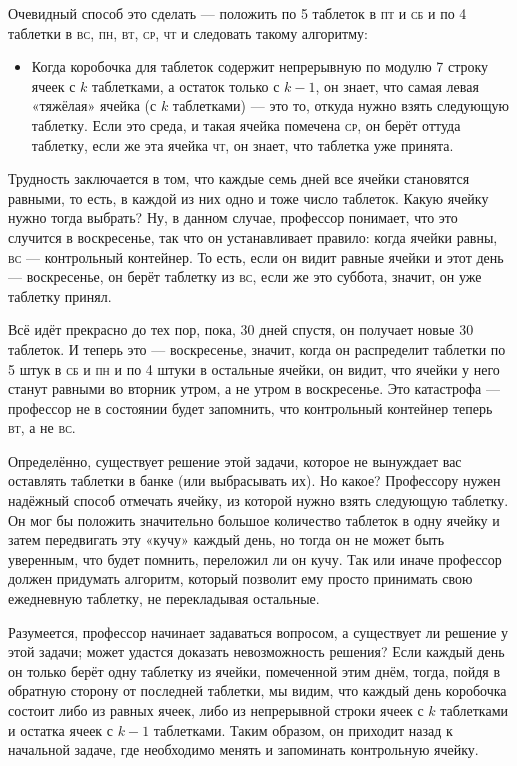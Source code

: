 Очевидный способ это сделать --- положить по 5 таблеток в \textsc{пт} и \textsc{сб} и по 4 таблетки в \textsc{вс}, \textsc{пн}, \textsc{вт}, \textsc{ср}, \textsc{чт} и следовать такому алгоритму:
\begin{itemize}
 \item[] Когда коробочка для таблеток содержит непрерывную по модулю 7 строку ячеек с $k$ таблетками, а остаток только с $k-1$, он знает, что самая левая «тяжёлая» ячейка (с $k$ таблетками) --- это то, откуда нужно взять следующую таблетку.
Если это среда, и такая ячейка помечена \textsc{ср}, он берёт оттуда таблетку, если же эта ячейка \textsc{чт}, он знает, что таблетка уже принята.
\end{itemize}

Трудность заключается в том, что каждые семь дней все ячейки становятся равными, то есть, в каждой из них одно и тоже число таблеток.
Какую ячейку нужно тогда выбрать?
Ну, в данном случае, профессор понимает, что это случится в воскресенье, так что он устанавливает правило: когда ячейки равны, \textsc{вс} --- контрольный контейнер.
То есть, если он видит равные ячейки и этот день --- воскресенье, он берёт таблетку из \textsc{вс}, если же это суббота, значит, он уже таблетку принял.

Всё идёт прекрасно до тех пор, пока, 30 дней спустя, он получает новые 30 таблеток.
И теперь это --- воскресенье, значит, когда он распределит таблетки по 5 штук в \textsc{сб} и \textsc{пн} и по 4 штуки в остальные ячейки, он видит, что ячейки у него станут равными во вторник утром, а не утром в воскресенье.
Это катастрофа --- профессор не в состоянии будет запомнить, что контрольный контейнер теперь \textsc{вт}, а не \textsc{вс}.

Определённо, существует решение этой задачи, которое не вынуждает вас оставлять таблетки в банке (или выбрасывать их).
Но какое? Профессору нужен надёжный способ отмечать ячейку, из которой нужно взять следующую таблетку.
Он мог бы положить значительно большое количество таблеток в одну ячейку и затем передвигать эту «кучу» каждый день, но тогда он не может быть уверенным, что будет помнить, переложил ли он кучу.
Так или иначе профессор должен придумать алгоритм, который позволит ему просто принимать свою ежедневную таблетку, не перекладывая остальные.

Разумеется, профессор начинает задаваться вопросом, а существует ли решение у этой задачи;
может удастся доказать невозможность решения?
Если каждый день он только берёт одну таблетку из ячейки, помеченной этим днём, тогда, пойдя в обратную сторону от последней таблетки, мы видим, что каждый день коробочка состоит либо из равных ячеек, либо из непрерывной строки ячеек с $k$ таблетками и остатка ячеек с $k-1$ таблетками.
Таким образом, он приходит назад к начальной задаче, где необходимо менять и запоминать контрольную ячейку.

